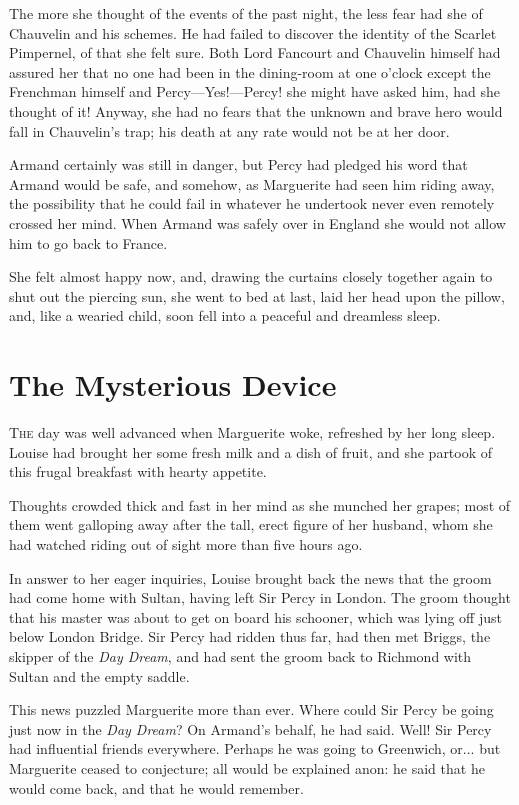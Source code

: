 \documentclass[paper=5.5in:8.5in,BCOR=7mm,twoside,DIV=calc,12pt,usegeometry,chapterprefix,endperiod,headings=big]{scrbook}
\begin{document}
The more she thought of the events of the past night, the less fear had she of Chauvelin and his schemes. He had failed to discover the identity of the Scarlet Pimpernel, of that she felt sure. Both Lord Fancourt and Chauvelin himself had assured her that no one had been in the dining-room at one o'clock except the Frenchman himself and Percy---Yes!---Percy! she might have asked him, had she thought of it! Anyway, she had no fears that the unknown and brave hero would fall in Chauvelin's trap; his death at any rate would not be at her door.

Armand certainly was still in danger, but Percy had pledged his word that Armand would be safe, and somehow, as Marguerite had seen him riding away, the possibility that he could fail in whatever he undertook never even remotely crossed her mind. When Armand was safely over in England she would not allow him to go back to France.

She felt almost happy now, and, drawing the curtains closely together again to shut out the piercing sun, she went to bed at last, laid her head upon the pillow, and, like a wearied child, soon fell into a peaceful and dreamless sleep.

\chapter{The Mysterious Device}

\lettrine[lines=4]{T}{he} day was well advanced when Marguerite woke, refreshed by her long sleep. Louise had brought her some fresh milk and a dish of fruit, and she partook of this frugal breakfast with hearty appetite.

Thoughts crowded thick and fast in her mind as she munched her grapes; most of them went galloping away after the tall, erect figure of her husband, whom she had watched riding out of sight more than five hours ago.

In answer to her eager inquiries, Louise brought back the news that the groom had come home with Sultan, having left Sir Percy in London. The groom thought that his master was about to get on board his schooner, which was lying off just below London Bridge. Sir Percy had ridden thus far, had then met Briggs, the skipper of the \textit{Day Dream}, and had sent the groom back to Richmond with Sultan and the empty saddle.

This news puzzled Marguerite more than ever. Where could Sir Percy be going just now in the \textit{Day Dream}? On Armand's behalf, he had said. Well! Sir Percy had influential friends everywhere. Perhaps he was going to Greenwich, or... but Marguerite ceased to conjecture; all would be explained anon: he said that he would come back, and that he would remember.
\end{document}
